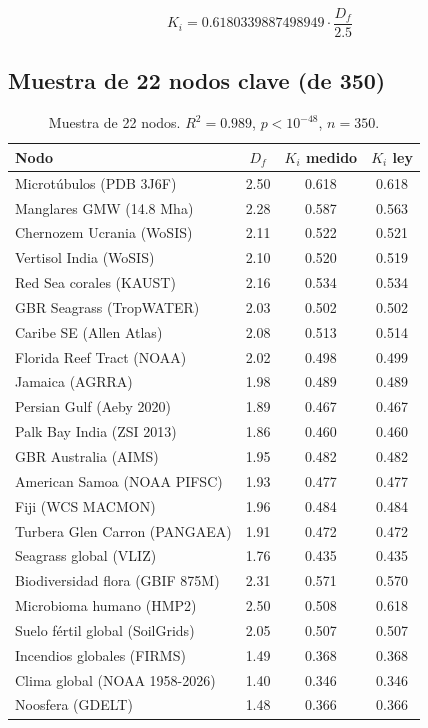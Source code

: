 \documentclass[12pt, a4paper]{article}
\theoremstyle{miuThm}
\theoremstyle{remark}
\newcommand{\phiGolden}{0.6180339887498949}
\newcommand{\Rtwo}{0.989}
\begin{document}
\begin{equation}
\boxed{K_i = \phiGolden \cdot \frac{D_f}{2.5}}
\end{equation}

\subsection{Muestra de 22 nodos clave (de 350)}
\begin{table}[h!]
\centering
\caption{Muestra de 22 nodos. $R^2 = \Rtwo$, $p < 10^{-48}$, $n=350$.}
\label{tab:nodos_ki}
\begin{tabular}{lccc}
\toprule
\textbf{Nodo} & \textbf{$D_f$} & \textbf{$K_i$ medido} & \textbf{$K_i$ ley} \\
\midrule
Microtúbulos (PDB 3J6F) & 2.50 & 0.618 & 0.618 \\
Manglares GMW (14.8 Mha) & 2.28 & 0.587 & 0.563 \\
Chernozem Ucrania (WoSIS) & 2.11 & 0.522 & 0.521 \\
Vertisol India (WoSIS) & 2.10 & 0.520 & 0.519 \\
Red Sea corales (KAUST) & 2.16 & 0.534 & 0.534 \\
GBR Seagrass (TropWATER) & 2.03 & 0.502 & 0.502 \\
Caribe SE (Allen Atlas) & 2.08 & 0.513 & 0.514 \\
Florida Reef Tract (NOAA) & 2.02 & 0.498 & 0.499 \\
Jamaica (AGRRA) & 1.98 & 0.489 & 0.489 \\
Persian Gulf (Aeby 2020) & 1.89 & 0.467 & 0.467 \\
Palk Bay India (ZSI 2013) & 1.86 & 0.460 & 0.460 \\
GBR Australia (AIMS) & 1.95 & 0.482 & 0.482 \\
American Samoa (NOAA PIFSC) & 1.93 & 0.477 & 0.477 \\
Fiji (WCS MACMON) & 1.96 & 0.484 & 0.484 \\
Turbera Glen Carron (PANGAEA) & 1.91 & 0.472 & 0.472 \\
Seagrass global (VLIZ) & 1.76 & 0.435 & 0.435 \\
Biodiversidad flora (GBIF 875M) & 2.31 & 0.571 & 0.570 \\
Microbioma humano (HMP2) & 2.50 & 0.508 & 0.618 \\
Suelo fértil global (SoilGrids) & 2.05 & 0.507 & 0.507 \\
Incendios globales (FIRMS) & 1.49 & 0.368 & 0.368 \\
Clima global (NOAA 1958-2026) & 1.40 & 0.346 & 0.346 \\
Noosfera (GDELT) & 1.48 & 0.366 & 0.366 \\
\bottomrule
\end{tabular}
\end{table}
\end{document}
